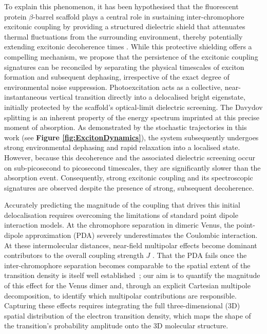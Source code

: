 \documentclass[journal=jpcbfk, manuscript=article, layout=twocolumn, doi=true]{achemso}
\begin{document}
To explain this phenomenon, it has been hypothesised that the fluorescent protein $\beta$-barrel scaffold plays a central role in sustaining inter-chromophore excitonic coupling by providing a structured dielectric shield that attenuates thermal fluctuations from the surrounding environment, thereby potentially extending excitonic decoherence times \cite{kim2019venusa206}. While this protective shielding offers a compelling mechanism, we propose that the {persistence of the} excitonic coupling {signatures} can be reconciled by separating the physical timescales of exciton formation and subsequent dephasing, irrespective of the exact degree of environmental noise suppression. Photoexcitation acts as a collective, near-instantaneous vertical transition directly into a delocalised bright eigenstate, initially protected by the scaffold's optical-limit dielectric screening. The Davydov splitting is an inherent property of the energy spectrum imprinted at this precise moment of absorption. As demonstrated by the stochastic trajectories in this work (see {\bf Figure \ref{fig:ExcitonDynamics}}), the system subsequently undergoes strong environmental dephasing and rapid relaxation into a localised state. However, because this decoherence and the associated dielectric screening occur on sub-picosecond to picosecond timescales, they are significantly slower than the absorption event. Consequently, strong excitonic coupling and its spectroscopic signatures are observed despite the presence of strong, subsequent decoherence.

Accurately predicting the magnitude of the coupling that drives this initial delocalisation requires overcoming the limitations of standard point dipole interaction models. At the chromophore separation in dimeric Venus, the point-dipole approximation (PDA) severely underestimates the Coulombic interaction. At these intermolecular distances, near-field multipolar effects become dominant contributors to the overall coupling strength $J$ \cite{scholes2003, kitohnishioka2017forster}. {That the PDA fails once the inter-chromophore separation becomes comparable to the spatial extent of the transition density is itself well established~\cite{sobakinskaya2018theory, scholes2003}; our aim is to quantify the magnitude of this effect for the Venus dimer and, through an explicit Cartesian multipole decomposition, to identify which multipolar contributions are responsible.} Capturing these effects requires integrating the full three-dimensional (3D) spatial distribution of the electron transition density, which maps the shape of the transition's probability amplitude onto the 3D molecular structure. 
\end{document}
